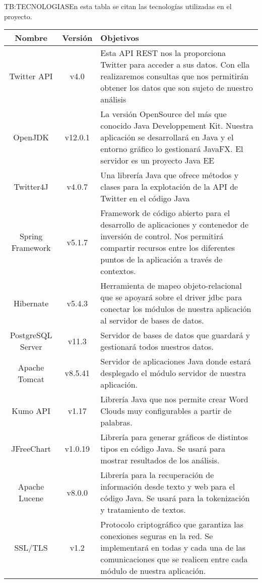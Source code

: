 \begin{table}[Tecnologías utilizadas]{TB:TECNOLOGIAS}{En esta tabla se citan las tecnologías utilizadas en el proyecto.}
  \begin{tabular}{|c|c|p{11cm}|}
    \hline
    \textbf{Nombre} & \textbf{Versión} & \textbf{Objetivos} \\
    \hline \hline
    Twitter API & v4.0 &Esta API REST nos la proporciona Twitter para acceder a sus datos. Con ella realizaremos consultas que nos permitirán obtener los datos que son sujeto de nuestro análisis \\
    OpenJDK& v12.0.1 &La versión OpenSource del más que conocido Java Developpement Kit. Nuestra aplicación se desarrollará en Java y el entorno gráfico lo gestionará JavaFX. El servidor es un proyecto Java EE\\
    Twitter4J & v4.0.7 & Una librería Java que ofrece métodos y clases para la explotación de la API de Twitter en el código Java\\
    Spring Framework & v5.1.7 & Framework de código abierto para el desarrollo de aplicaciones y contenedor de inversión de control. Nos permitirá compartir recursos entre los diferentes puntos de la aplicación a través de contextos. \\
	Hibernate & v5.4.3 & Herramienta de mapeo objeto-relacional que se apoyará sobre el driver jdbc para conectar los módulos de nuestra aplicación al servidor de bases de datos. \\
	PostgreSQL Server & v11.3 & Servidor de bases de datos que guardará y gestionará todos nuestros datos.\\
	Apache Tomcat & v8.5.41  & Servidor de aplicaciones Java donde estará desplegado el módulo servidor de nuestra aplicación. \\
	Kumo API & v1.17 & Librería Java que nos permite crear Word Clouds muy configurables a partir de palabras.\\
	JFreeChart & v1.0.19 & Librería para generar gráficos de distintos tipos en código Java. Se usará para mostrar resultados de los análisis. \\
	Apache Lucene & v8.0.0 & Librería para la recuperación de información desde texto y web para el código Java. Se usará para la tokenización y tratamiento de textos.\\
	SSL/TLS & v1.2 & Protocolo criptográfico que garantiza las conexiones seguras en la red. Se implementará en todas y cada una de las comunicaciones que se realicen entre cada módulo de nuestra aplicación.\\
    \hline
  \end{tabular}
\end{table}